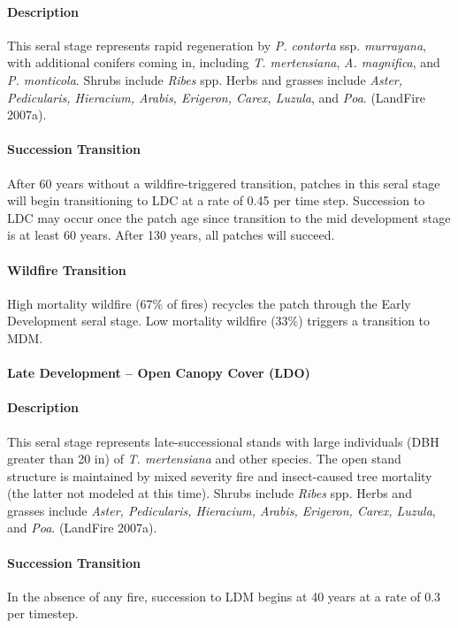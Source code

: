 \paragraph{Description} This seral stage represents rapid regeneration by \emph{P. contorta} ssp. \emph{murrayana}, with additional conifers coming in, including \emph{T. mertensiana}, \emph{A. magnifica}, and \emph{P. monticola}. Shrubs include \emph{Ribes} spp. Herbs and grasses include \emph{Aster, Pedicularis, Hieracium, Arabis, Erigeron, Carex, Luzula}, and \emph{Poa}. (LandFire 2007a).

\paragraph{Succession Transition} After 60 years without a wildfire-triggered transition, patches in this seral stage will begin transitioning to LDC at a rate of 0.45 per time step. Succession to LDC may occur once the patch age since transition to the mid development stage is at least 60 years. After 130 years, all patches will succeed.

\paragraph{Wildfire Transition} High mortality wildfire (67\% of fires) recycles the patch through the Early Development seral stage. Low mortality wildfire (33\%) triggers a transition to MDM.

\noindent\hrulefill


\paragraph{Late Development – Open Canopy Cover (LDO)}

\paragraph{Description} This seral stage represents late-successional stands with large individuals (DBH greater than 20 in) of \emph{T. mertensiana} and other species. The open stand structure is maintained by mixed severity fire and insect-caused tree mortality (the latter not modeled at this time). Shrubs include \emph{Ribes} spp. Herbs and grasses include \emph{Aster, Pedicularis, Hieracium, Arabis, Erigeron, Carex, Luzula}, and \emph{Poa}. (LandFire 2007a).

\paragraph{Succession Transition} In the absence of any fire, succession to LDM begins at 40 years at a rate of 0.3 per timestep.

